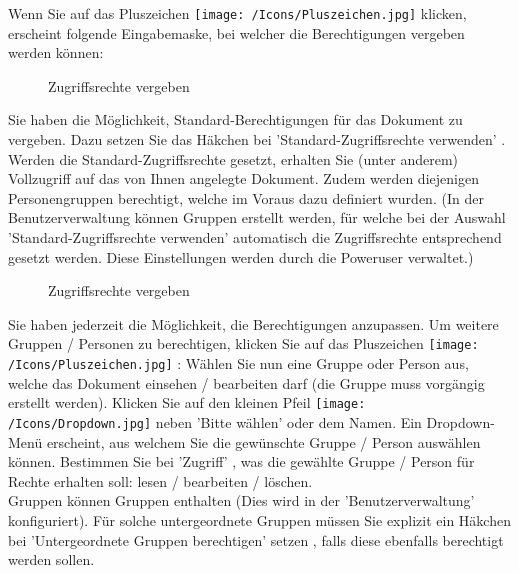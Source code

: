 Wenn Sie auf das Pluszeichen \texttt{[image: /Icons/Pluszeichen.jpg]}  klicken, erscheint folgende Eingabemaske, bei welcher die Berechtigungen vergeben werden können:

\begin{figure}[H]
\caption{Zugriffsrechte vergeben}
\end{figure}

Sie haben die Möglichkeit, Standard-Berechtigungen für das Dokument zu vergeben. Dazu setzen Sie das Häkchen bei 'Standard-Zugriffsrechte verwenden' . Werden die Standard-Zugriffsrechte gesetzt, erhalten Sie (unter anderem) Vollzugriff auf das von Ihnen angelegte Dokument. Zudem werden diejenigen Personengruppen berechtigt, welche im Voraus dazu definiert wurden. (In der Benutzerverwaltung können Gruppen erstellt werden, für welche bei der Auswahl 'Standard-Zugriffsrechte verwenden' automatisch die Zugriffsrechte entsprechend gesetzt werden. Diese Einstellungen werden durch die Poweruser verwaltet.)

\begin{figure}[H]
\caption{Zugriffsrechte vergeben}
\end{figure}

Sie haben jederzeit die Möglichkeit, die Berechtigungen anzupassen. Um weitere Gruppen / Personen zu berechtigen, klicken Sie auf das Pluszeichen \texttt{[image: /Icons/Pluszeichen.jpg]} : Wählen Sie nun eine Gruppe oder Person aus, welche das Dokument einsehen / bearbeiten darf (die Gruppe muss vorgängig erstellt werden). Klicken Sie auf den kleinen Pfeil \texttt{[image: /Icons/Dropdown.jpg]} neben 'Bitte wählen' oder dem Namen. Ein Dropdown-Menü erscheint, aus welchem Sie die gewünschte Gruppe / Person auswählen können. Bestimmen Sie bei 'Zugriff' , was die gewählte Gruppe / Person für Rechte erhalten soll: lesen / bearbeiten / löschen.\\
Gruppen können Gruppen enthalten (Dies wird in der 'Benutzerverwaltung' konfiguriert). Für solche untergeordnete Gruppen müssen Sie explizit ein Häkchen bei 'Untergeordnete Gruppen berechtigen' setzen , falls diese ebenfalls berechtigt werden sollen.

